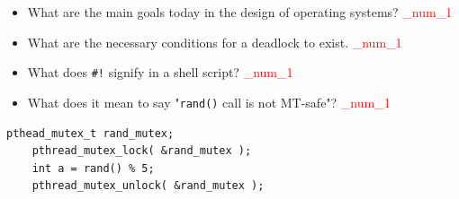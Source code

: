 \documentclass[9pt,landscape]{memoir}
\newcommand{\answer}[1]{\textcolor{red}{_num_1}}
\begin{document}
\begin{multicols}{6}
\begin{itemize}
    \item What are the main goals today in the design of operating systems? \answer{Convenience for user, efficient utilization of the computer resources (CPU, memory, I/O devices), and expandibility.}
    \item What are the necessary conditions for a deadlock to exist. \answer{a) mutual exclusion; b) hold and wait; c) no preemption d) circular wait.}
    \item What does \verb$#!$ signify in a shell script? \answer{It's a special notation which tells the shell, "After this mark, read the name of the script interpreter i want to use."}
    \item What does it mean to say "\verb$rand()$ call is not MT-safe"? \answer{MT-Safe : MultiThread-Safe This means that the behavior of the function \texttt{rand()} is not stable when two threads try to use it at the same time. To get around this problem, we use MT-safe interfaces (such as \texttt{rand\_r()}). However, \texttt{rand\_r()} doesn't exist on some multithreaded operating systems (e.g. LINUX), therefore, you need to execute such calls inside a Critical Section to make sure that only one thread can call the function at any one time.}
\end{itemize}

\begin{lstlisting}[style=cC++,aboveskip=1pt,belowskip=1pt]
    pthead_mutex_t rand_mutex;
    pthread_mutex_lock( &rand_mutex );
    int a = rand() % 5;
    pthread_mutex_unlock( &rand_mutex );
\end{lstlisting}


\end{multicols}
\end{document}
